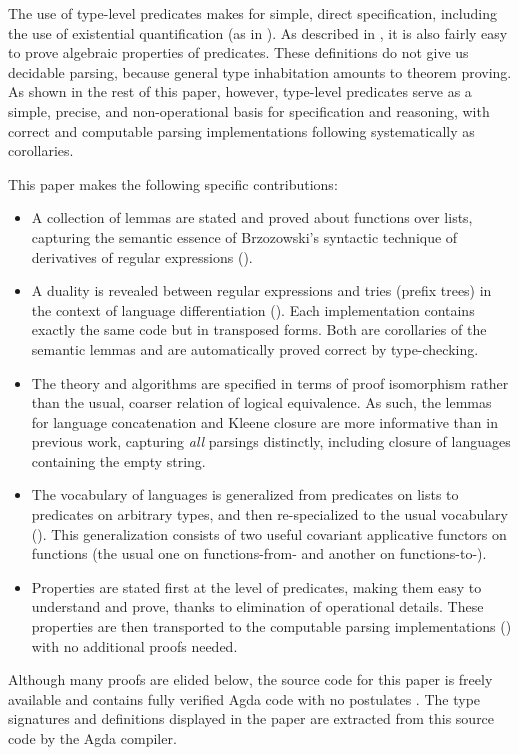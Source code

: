 \documentclass[acmsmall,screen,timestamp]{acmart}  %
\begin{document}
The use of type-level predicates makes for simple, direct specification, including the use of existential quantification (as in ).
As described in , it is also fairly easy to prove algebraic properties of predicates.
These definitions do not give us decidable parsing, because general type inhabitation amounts to theorem proving.
As shown in the rest of this paper, however, type-level predicates serve as a simple, precise, and non-operational basis for specification and reasoning, with correct and computable parsing implementations following systematically as corollaries.

This paper makes the following specific contributions:
\begin{itemize}
\item
  A collection of lemmas are stated and proved about functions over lists, capturing the semantic essence of Brzozowski's syntactic technique of derivatives of regular expressions ().
\item
  A duality is revealed between regular expressions and tries (prefix trees) in the context of language differentiation ().
  Each implementation contains exactly the same code but in transposed forms.
  Both are corollaries of the semantic lemmas and are automatically proved correct by type-checking.
\item
  The theory and algorithms are specified in terms of proof isomorphism rather than the usual, coarser relation of logical equivalence.
  As such, the lemmas for language concatenation and Kleene closure are more informative than in previous work, capturing \emph{all} parsings distinctly, including closure of languages containing the empty string.
\item
  The vocabulary of languages is generalized from predicates on lists to predicates on arbitrary types, and then re-specialized to the usual vocabulary ().
  This generalization consists of two useful covariant applicative functors on functions (the usual one on functions-from- and another on functions-to-).
\item
  Properties are stated first at the level of predicates, making them easy to understand and prove, thanks to elimination of operational details.
  These properties are then transported to the computable parsing implementations () with no additional proofs needed.
\end{itemize}
Although many proofs are elided below, the source code for this paper is freely available and contains fully verified Agda code with no postulates \citep{Elliott2021-language-derivatives-repo}.
The type signatures and definitions displayed in the paper are extracted from this source code by the Agda compiler.
\end{document}
